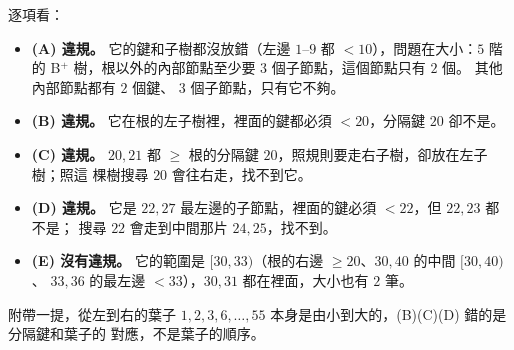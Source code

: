 \begin{pastsoln}
逐項看：
\begin{itemize}
\item \textbf{(A) 違規。} 它的鍵和子樹都沒放錯（左邊 $1$--$9$ 都 $< 10$），問題在大小：$5$ 階的
B$^{+}$ 樹，根以外的內部節點至少要 $3$ 個子節點，這個節點只有 $2$ 個。 其他內部節點都有 $2$ 個鍵、
$3$ 個子節點，只有它不夠。
\item \textbf{(B) 違規。} 它在根的左子樹裡，裡面的鍵都必須 $< 20$，分隔鍵 $20$ 卻不是。
\item \textbf{(C) 違規。} $20, 21$ 都 $\ge$ 根的分隔鍵 $20$，照規則要走右子樹，卻放在左子樹；照這
棵樹搜尋 $20$ 會往右走，找不到它。
\item \textbf{(D) 違規。} 它是 $22, 27$ 最左邊的子節點，裡面的鍵必須 $< 22$，但 $22, 23$ 都不是；
搜尋 $22$ 會走到中間那片 $24, 25$，找不到。
\item \textbf{(E) 沒有違規。} 它的範圍是 $[30, 33)$（根的右邊 $\ge 20$、$30, 40$ 的中間 $[30, 40)$、
$33, 36$ 的最左邊 $< 33$），$30, 31$ 都在裡面，大小也有 $2$ 筆。
\end{itemize}
附帶一提，從左到右的葉子 $1, 2, 3, 6, \ldots, 55$ 本身是由小到大的，(B)(C)(D) 錯的是分隔鍵和葉子的
對應，不是葉子的順序。
\end{pastsoln}
